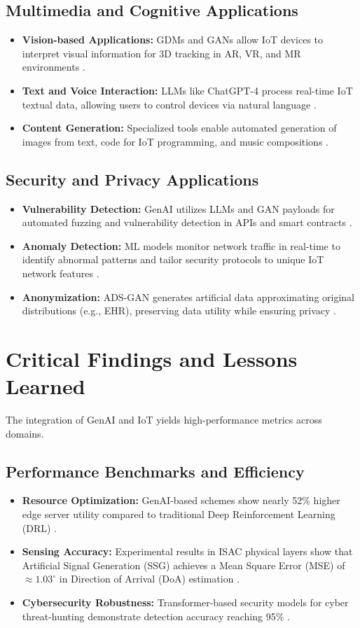 \documentclass[journal]{IEEEtran}
\begin{document}
\subsection{Multimedia and Cognitive Applications}
\begin{itemize}
    \item \textbf{Vision-based Applications:} GDMs and GANs allow IoT devices to interpret visual information for 3D tracking in AR, VR, and MR environments \cite{4, 15}.
    \item \textbf{Text and Voice Interaction:} LLMs like ChatGPT-4 process real-time IoT textual data, allowing users to control devices via natural language \cite{4, 26}.
    \item \textbf{Content Generation:} Specialized tools enable automated generation of images from text, code for IoT programming, and music compositions \cite{6}.
\end{itemize}

\subsection{Security and Privacy Applications}
\begin{itemize}
    \item \textbf{Vulnerability Detection:} GenAI utilizes LLMs and GAN payloads for automated fuzzing and vulnerability detection in APIs and smart contracts \cite{1}.
    \item \textbf{Anomaly Detection:} ML models monitor network traffic in real-time to identify abnormal patterns and tailor security protocols to unique IoT network features \cite{23, 25}.
    \item \textbf{Anonymization:} ADS-GAN generates artificial data approximating original distributions (e.g., EHR), preserving data utility while ensuring privacy \cite{21}.
\end{itemize}

\section{Critical Findings and Lessons Learned}
The integration of GenAI and IoT yields high-performance metrics across domains. 
\subsection{Performance Benchmarks and Efficiency}
\begin{itemize}
    \item \textbf{Resource Optimization:} GenAI-based schemes show nearly 52\% higher edge server utility compared to traditional Deep Reinforcement Learning (DRL) \cite{4}.
    \item \textbf{Sensing Accuracy:} Experimental results in ISAC physical layers show that Artificial Signal Generation (SSG) achieves a Mean Square Error (MSE) of $\approx 1.03^{\circ}$ in Direction of Arrival (DoA) estimation \cite{5}.
    \item \textbf{Cybersecurity Robustness:} Transformer-based security models for cyber threat-hunting demonstrate detection accuracy reaching 95\% \cite{24}.
\end{itemize}
\end{document}
